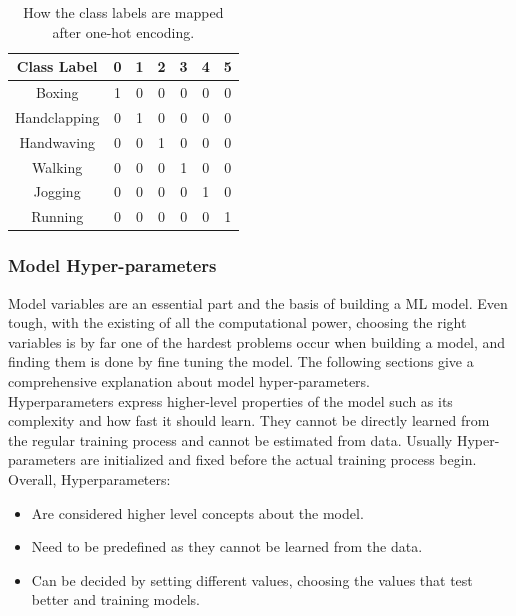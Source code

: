 \begin{table}[]
\centering
\begin{tabular}{|c|c|c|c|c|c|c|}
\hline
\textbf{Class Label} & \textbf{0} & \textbf{1} & \textbf{2} & \textbf{3} & \textbf{4} & \textbf{5} \\ \hline
Boxing               & 1          & 0          & 0          & 0          & 0          & 0          \\ \hline
Handclapping         & 0          & 1          & 0          & 0          & 0          & 0          \\ \hline
Handwaving           & 0          & 0          & 1          & 0          & 0          & 0          \\ \hline
Walking              & 0          & 0          & 0          & 1          & 0          & 0          \\ \hline
Jogging              & 0          & 0          & 0          & 0          & 1          & 0          \\ \hline
Running              & 0          & 0          & 0          & 0          & 0          & 1          \\ \hline
\end{tabular}
\caption{How the class labels are mapped after one-hot encoding.}
\label{my-label}
\end{table}

\subsubsection{Model Hyper-parameters}
\hspace{5mm} Model variables are an essential part and the basis of building a ML model. Even tough, with the existing of all the computational power, choosing the right variables is by far one of the hardest problems occur when building a model, and finding them is done by fine tuning the model. The following sections give a comprehensive explanation about model hyper-parameters.\\

Hyperparameters express higher-level properties of the model such as its complexity and how fast it should learn. They cannot be directly learned from the regular training process and cannot be estimated from data. Usually Hyper-parameters are initialized and fixed before the actual training process begin.\\

Overall, Hyperparameters:
\begin{itemize}
\item Are considered higher level concepts about the model.
\item Need to be predefined as they cannot be learned from the data.
\item Can be decided by setting different values, choosing the values that test better and training models.
\end{itemize}\\

